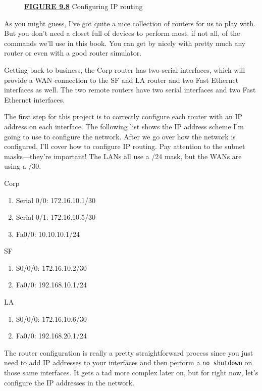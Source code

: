 \begin{figure}
\centering
\caption{{\protect\hyperlink{c09.xhtmlux5cux23figureanchor9-8}{\textbf{FIGURE
9.8}} Configuring IP routing}}
\end{figure}

As you might guess, I've got quite a nice collection of routers for us
to play with. But you don't need a closet full of devices to perform
most, if not all, of the commands we'll use in this book. You can get by
nicely with pretty much any router or even with a good router simulator.

Getting back to business, the Corp router has two serial interfaces,
which will provide a WAN connection to the SF and LA router and two Fast
Ethernet interfaces as well. The two remote routers have two serial
interfaces and two Fast Ethernet interfaces.

The first step for this project is to correctly configure each router
with an IP address on each interface. The following list shows the IP
address scheme I'm going to use to configure the network. After we go
over how the network is configured, I'll cover how to configure
\protect\hypertarget{c09.xhtmlux5cux23Page_373}{}{}IP routing. Pay
attention to the subnet masks---they're important! The LANs all use a
/24 mask, but the WANs are using a /30.

Corp

\begin{enumerate}
\tightlist
\item
  Serial 0/0: 172.16.10.1/30
\item
  Serial 0/1: 172.16.10.5/30
\item
  Fa0/0: 10.10.10.1/24
\end{enumerate}

SF

\begin{enumerate}
\tightlist
\item
  S0/0/0: 172.16.10.2/30
\item
  Fa0/0: 192.168.10.1/24
\end{enumerate}

LA

\begin{enumerate}
\tightlist
\item
  S0/0/0: 172.16.10.6/30
\item
  Fa0/0: 192.168.20.1/24
\end{enumerate}

The router configuration is really a pretty straightforward process
since you just need to add IP addresses to your interfaces and then
perform a \texttt{no\ shutdown} on those same interfaces. It gets a tad
more complex later on, but for right now, let's configure the IP
addresses in the network.

